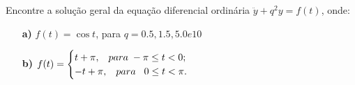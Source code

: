 \linespread{1.5}
Encontre a solução geral da equação diferencial ordinária $\ddot{y} + q^2y = f(t)$, onde:
\begin{itemize}
    \item[\textbf{a)}] $f(t) = \cos{t}$, para $q = 0.5, 1.5, 5.0 e 10$
    \item[\textbf{b)}] $f(t) = \begin{cases} t+\pi, \hspace{0.3cm} para \hspace{0.1cm} -\pi \leq t < 0; \\-t + \pi, \hspace{0.3cm} para \hspace{0.3cm} 0 \leq t < \pi. \end{cases}\,$
\end{itemize}